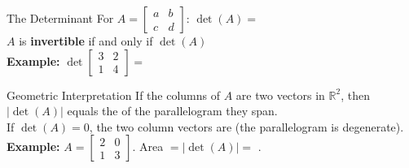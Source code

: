 \documentclass[10pt]{article}
\begin{document}
\vspace{0.08in}

\begin{notesbox}{The Determinant}
For $A = \begin{bmatrix}a&b\\c&d\end{bmatrix}$: \quad
$\det(A) = $ \\[10pt]

$A$ is \textbf{invertible} if and only if $\det(A)$ \\[6pt]

\textbf{Example:} $\det\begin{bmatrix}3&2\\1&4\end{bmatrix} = $
\end{notesbox}

\vspace{0.08in}

\begin{notesbox}{Geometric Interpretation}
If the columns of $A$ are two vectors in $\mathbb{R}^2$, then $|\det(A)|$ equals the
 of the parallelogram they span.\\[6pt]

If $\det(A) = 0$, the two column vectors are  (the parallelogram is degenerate).\\[8pt]

\textbf{Example:} $A = \begin{bmatrix}2&0\\1&3\end{bmatrix}$. \quad
Area $= |\det(A)| = $ .
\end{notesbox}
\end{document}
